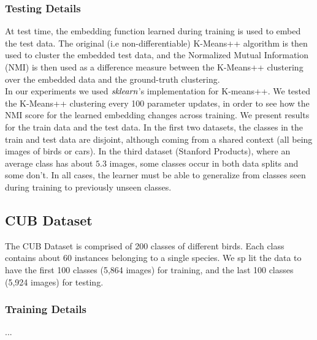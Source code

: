 \subsubsection{Testing Details}
At test time, the embedding function learned during training is used to embed the test data. 
The original (i.e non-differentiable) K-Means++ algorithm is then used to cluster the embedded test data, and the Normalized Mutual Information (NMI) \cite{greenwade93} is then used as a difference measure between the K-Means++ clustering over the embedded data and the ground-truth clustering.\\
In our experiments we used $\it{sklearn}$'s \cite{greenwade93} implementation for K-means++.
We tested the K-Means++ clustering every 100 parameter updates, in order to see how the NMI score for the learned embedding changes across training. We present results for the train data and the test data. %
In the first two datasets, the classes in the train and test data are disjoint, although coming from a shared context (all being images of birds or cars). In the third dataset (Stanford Products), where an average class has about $5.3$ images, some classes occur in both data splits and some don't. In all cases, the learner must be able to generalize from classes seen during training to previously unseen classes. 

\subsection{CUB Dataset}
The CUB Dataset is comprised of 200 classes of different birds. Each class contains about 60 instances belonging to a single species. We sp lit the data to have the first 100 classes (5,864 images) for training, and the last 100 classes (5,924 images) for testing.
\subsubsection{Training Details}
...
